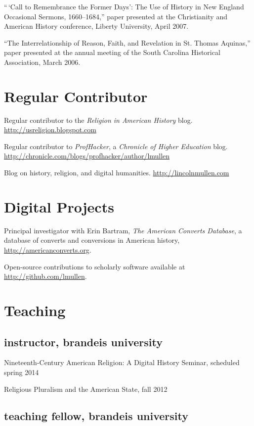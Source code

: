 \documentclass[11pt]{article}
\begin{document}
``\,`Call to Remembrance the Former Days': The Use of History in New
England Occasional Sermons, 1660--1684,'' paper presented at the
Christianity and American History conference, Liberty University, April
2007.

``The Interrelationship of Reason, Faith, and Revelation in St. Thomas
Aquinas,'' paper presented at the annual meeting of the South Carolina
Historical Association, March 2006.

\section{Regular Contributor}

Regular contributor to the \emph{Religion in American History} blog. 
\href{http://usreligion.blogspot.com}{http://usreligion.blogspot.com}

Regular contributor to \emph{ProfHacker}, a \emph{Chronicle of Higher
Education} blog.
\url{http://chronicle.com/blogs/profhacker/author/lmullen}

Blog on history, religion, and digital humanities.
\url{http://lincolnmullen.com}

\section{Digital Projects}

Principal investigator with Erin Bartram, \emph{The American Converts 
Database}, a database of converts and conversions in American history, 
\href{http://americanconverts.org}{http://americanconverts.org}.

Open-source contributions to scholarly software available at 
\href{http://github.com/lmullen}{http://github.com/lmullen}.


\section{Teaching}

\subsection{instructor, brandeis university}

Nineteenth-Century American Religion: A Digital History Seminar, 
scheduled spring 2014

Religious Pluralism and the American State, fall 2012

\subsection{teaching fellow, brandeis university}
\end{document}
